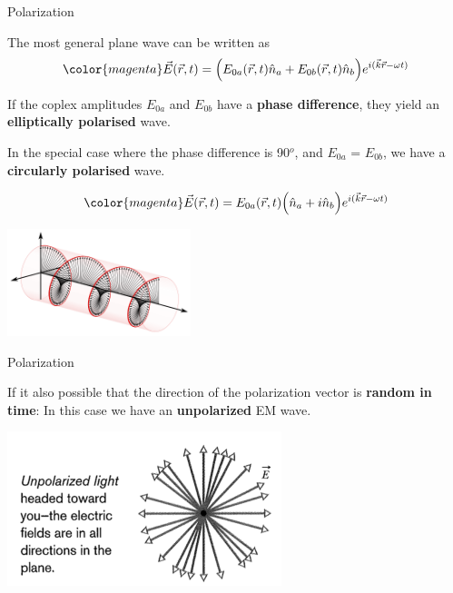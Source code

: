 %
%
%

\begin{frame}{Polarization}

The most general plane wave can be written as
\begin{equation*}
     {\color{magenta} \vec{E}(\vec{r},t) =
        \Big( E_{0a}(\vec{r},t) \hat{n}_a + E_{0b}(\vec{r},t) \hat{n}_b \Big)  e^{i (\vec{k} \vec{r} -\omega t)}  }
\end{equation*}

If the coplex amplitudes $E_{0a}$ and $E_{0b}$ have a {\bf phase difference},
they yield an {\bf elliptically polarised} wave.\\

\vspace{0.2cm}

In the special case where the phase difference is 90$^o$,
and $E_{0a}$ = $E_{0b}$, we have a {\bf circularly polarised} wave.

\begin{equation*}
     {\color{magenta} \vec{E}(\vec{r},t) =
        E_{0a}(\vec{r},t) \Big(  \hat{n}_a + i \hat{n}_b \Big)  e^{i (\vec{k} \vec{r} -\omega t)}  }
\end{equation*}

\begin{center}
    \includegraphics[width=0.40\textwidth]{./images/schematics/wave_circular_polarization.png}
\end{center}

\end{frame}

%
%
%

\begin{frame}{Polarization}

If it also possible that the direction of the polarization vector is
{\bf random in time}: In this case we have an {\bf unpolarized} EM wave.

\begin{center}
    \includegraphics[width=0.60\textwidth]{./images/schematics/unpolarised_light_heading_towards_you.png}
\end{center}

\end{frame}


